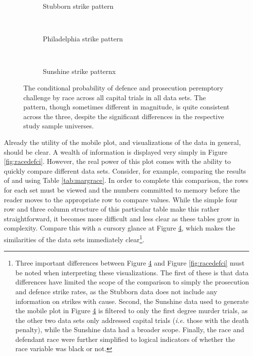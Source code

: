 \begin{figure}[h!]
  \centering
  \begin{subfigure}{0.4\textwidth}
    \caption{\footnotesize Stubborn strike pattern}
    \label{fig:stubcomp}
  \end{subfigure}
  ~
  \begin{subfigure}{0.4\textwidth}
    \caption{\footnotesize Philadelphia strike pattern}
    \label{fig:philcomp}
  \end{subfigure}
  ~
  \begin{subfigure}{0.4\textwidth}
    \caption{\footnotesize Sunshine strike patternx}
    \label{fig:suncomp}
  \end{subfigure}
  \caption[Strikes by Racial Combination (All Capital Trial Data)]
  {\footnotesize The conditional probability of defence and prosecution peremptory challenge by race across all
    capital trials in all data sets. The pattern, though sometimes different in magnitude, is quite consistent across the three,
    despite the significant differences in the respective study sample universes.}
  \label{fig:racedefalldata}
\end{figure}

Already the utility of the mobile plot, and visualizations of the data in general, should be clear. A wealth of information is
displayed very simply in Figure \ref{fig:racedefci}. However, the real power of this plot comes with the ability to quickly
compare different data sets. Consider, for example, comparing the results of \cite{PerempChalMurder} and \cite{StubbornLegacy}
using Table \ref{tab:margrace}. In order to complete this comparison, the rows for each set must be viewed and the numbers
committed to memory before the reader moves to the appropriate row to compare values. While the simple four row and three column
structure of this particular table make this rather straightforward,
it becomes more difficult and less clear as these tables grow
in complexity. Compare this with a cursory glance at Figure \ref{fig:racedefalldata}, which makes the similarities of the data
sets immediately clear\footnote{Three important differences between Figure \ref{fig:racedefalldata} and Figure \ref{fig:racedefci}
  must be noted when interpreting these visualizations. The first of these is that data differences have limited the scope of
  the comparison to simply the prosecution and defence strike rates, as the Stubborn data does not include any information on
  strikes with cause. Second, the Sunshine data used to generate the mobile plot in Figure \ref{fig:racedefalldata} is filtered to
  only the first degree murder trials, as the other two data sets only addressed capital trials (\textit{i.e.} those with the
  death penalty), while the Sunshine data had a broader scope. Finally, the race and defendant race were further simplified to
  logical indicators of whether the race variable was black or not.}.

